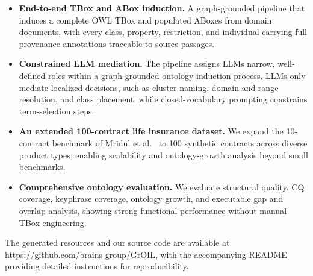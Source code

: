 \documentclass[sigconf]{acmart}
\begin{document}
\begin{itemize}[topsep=2pt, itemsep=0pt, parsep=0pt, leftmargin=0.75em]
    \item \textbf{End-to-end TBox and ABox induction.} A graph-grounded pipeline that induces a complete OWL TBox and populated ABoxes from domain documents, with every class, property, restriction, and individual carrying full provenance annotations traceable to source passages.

    \item \textbf{Constrained LLM mediation.} The pipeline assigns LLMs narrow, well-defined roles within a graph-grounded ontology induction process. LLMs only mediate localized decisions, such as cluster naming, domain and range resolution, and class placement, while closed-vocabulary prompting constrains term-selection steps.

    \item \textbf{An extended 100-contract life insurance dataset.} We expand the 10-contract benchmark of Mridul et al.~\cite{mridul2026benchmark} to 100 synthetic contracts across diverse product types, enabling scalability and ontology-growth analysis beyond small benchmarks.

    \item \textbf{Comprehensive ontology evaluation.} We evaluate structural quality, CQ coverage, keyphrase coverage, ontology growth, and executable gap and overlap analysis, showing strong functional performance without manual TBox engineering.
\end{itemize}

The generated resources and our source code are available at \url{https://github.com/brains-group/GrOIL}, with the accompanying README providing detailed instructions for reproducibility.

\vspace{-0.7em}
\end{document}
